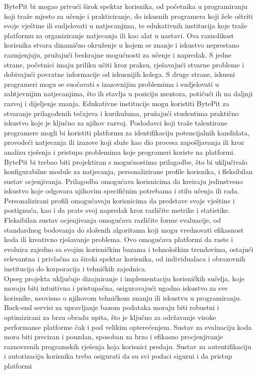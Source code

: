 		BytePit bi mogao privući širok spektar korisnika, od početnika u programiranju 
		koji traže mjesto za učenje i prakticiranje, do iskusnih programera koji žele 
		oštriti svoje vještine ili sudjelovati u natjecanjima, te edukativnih institucija 
		koje traže platformu za organiziranje natjecanja ili kao alat u nastavi. Ova 
		raznolikost korisnika stvara dinamično okruženje u kojem se znanje i iskustvo 
		neprestano razmjenjuju, pružajući beskrajne mogućnosti za učenje i napredak. 
		S jedne strane, početnici imaju priliku učiti kroz praksu, rješavajući stvarne 
		probleme i dobivajući povratne informacije od iskusnijih kolega. S druge strane, 
		iskusni programeri mogu se suočavati s izazovnijim problemima i sudjelovati u 
		zahtjevnijim natjecanjima, što ih stavlja u poziciju mentora, potičući ih na 
		daljnji razvoj i dijeljenje znanja. Edukativne institucije mogu koristiti BytePit 
		za stvaranje prilagođenih tečajeva i kurikuluma, pružajući studentima praktično 
		iskustvo koje je ključno za njihov razvoj. Poslodavci koji traže talentirane 
		programere mogli bi koristiti platformu za identifikaciju potencijalnih kandidata, 
		provodeći natjecanja ili izazove koji služe kao dio procesa zapošljavanja ili kroz 
		analizu rješenja i pristupa problemima koje programeri koriste na platformi.
		\\

		BytePit bi trebao biti projektiran s mogućnostima prilagodbe, što bi uključivalo 
		konfigurabilne module za natjecanja, personalizirane profile korisnika, i fleksibilan 
		sustav ocjenjivanja. Prilagodba omogućava korisnicima da kreiraju jedinstveno 
		iskustvo koje odgovara njihovim specifičnim potrebama i stilu učenja ili rada. 
		Personalizirani profili omogućavaju korisnicima da predstave svoje vještine i 
		postignuća, kao i da prate svoj napredak kroz različite metrike i statistike. 
		Fleksibilan sustav ocjenjivanja omogućava različite forme evaluacije, od standardnog 
		bodovanja do složenih algoritama koji mogu vrednovati efikasnost koda ili kreativno 
		rješavanje problema. Ovo omogućava platformi da raste i evoluira zajedno sa svojim 
		korisničkim bazama i tehnološkim trendovima, ostajući relevantna i privlačna za 
		široki spektar korisnika, od individualaca i obrazovnih institucija do korporacija 
		i tehničkih zajednica.
		\\

		Opseg projekta uključuje dizajniranje i implementaciju korisničkih sučelja, koje 
		moraju biti intuitivna i pristupačna, osiguravajući ugodno iskustvo za sve korisnike, 
		neovisno o njihovom tehničkom znanju ili iskustvu u programiranju. Back-end servisi 
		za upravljanje bazom podataka moraju biti robustni i optimizirani za brzu obradu 
		upita, što je ključno za održavanje visoke performanse platforme čak i pod velikim 
		opterećenjem. Sustav za evaluaciju koda mora biti precizan i pouzdan, sposoban za 
		brzo i efikasno procjenjivanje raznovrsnih programskih rješenja koja korisnici 
		predaju. Sustav za autentifikaciju i autorizaciju korisnika treba osigurati da su 
		svi podaci sigurni i da pristup platformi
		\\

